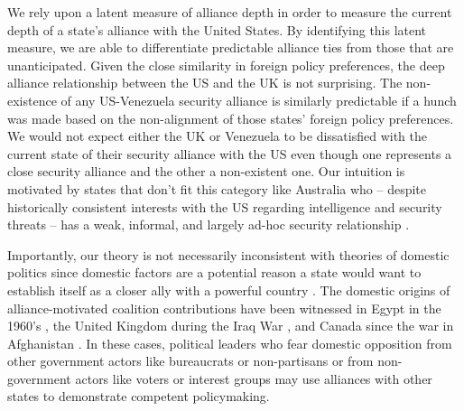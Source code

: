 \documentclass[12pt,letterpaper]{article}
\begin{document}
		We rely upon a latent measure of alliance depth in order to measure the current depth of a state's alliance with the United States. By identifying this latent measure, we are able
		to differentiate predictable alliance ties from those that are unanticipated. Given the close similarity in foreign policy preferences, the deep alliance relationship between the US and the UK is not surprising. The non-existence of any US-Venezuela security alliance is similarly predictable if a hunch was made based on the non-alignment of those states' foreign policy preferences. We would not expect either the UK or Venezuela to be dissatisfied with the current state of their security alliance with the US even though one represents a close security alliance and the other a non-existent one. Our intuition is motivated by states that don't fit this category like Australia who -- despite historically consistent interests with the US regarding intelligence and security threats -- has a weak, informal, and largely ad-hoc security relationship \citep{fruhling_anzusreallyalliance_2018}.
		
		Importantly, our theory is not necessarily inconsistent with theories of domestic politics since domestic factors are a potential reason a state would want to establish itself as a closer ally with a powerful country \citep{tago_whenaredemocratic_2009, pilster_aredemocraciesbetter_2011, wolford_nationalleaderspolitical_2016}. The domestic origins of alliance-motivated coalition contributions have been witnessed in Egypt in the 1960's \citep{barnett_domesticsourcesalliances_1991}, the United Kingdom during the Iraq War \citep{davidson_americaallieswar_2011}, and Canada since the war in Afghanistan \citep{massie_alliancevaluestatus_2018, mckay_whycanadabest_2018}. In these cases, political leaders who fear domestic opposition from other government actors like bureaucrats or non-partisans or from non-government actors like voters or interest groups may use alliances with other states to demonstrate competent policymaking.
		
\end{document}
